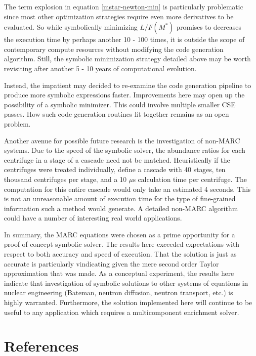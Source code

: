 \documentclass[preprint,12pt]{elsarticle}
\newcommand{\us}[0]{$\mu$s }
\begin{document}
The term explosion in equation \ref{mstar-newton-min} is particularly problematic 
since most other optimization strategies require
even more derivatives to be evaluated.  So while symbolically minimizing $L/F(M^*)$
 promises
to decreases the execution time by perhaps another 10 - 100 times, it is 
outside the scope of contemporary compute resources without modifying the 
code generation algorithm.  Still, the symbolic minimization strategy detailed above
may be worth revisiting after another 5 - 10 years of computational evolution.

Instead, the impatient may decided to re-examine the code generation pipeline to 
produce more symbolic expressions faster.  Improvements here may open up the 
possibility of
a symbolic minimizer.  This could involve multiple smaller CSE passes.  How 
such code generation routines fit together remains as an open problem.

Another avenue for possible future research is the investigation of non-MARC 
systems.  Due to the speed of the symbolic solver, the abundance ratios for 
each centrifuge in a stage of a cascade need not be matched.  Heuristically
if the centrifuges were treated individually, define a cascade with 40 stages, 
ten thousand centrifuges per stage, and a 10 \us calculation time per centrifuge. 
The computation for this entire
cascade would only take an estimated 4 seconds.  This is not an unreasonable 
amount of execution time for the type of fine-grained information such a 
method would generate.  A detailed non-MARC algorithm could have a number of
interesting real world applications.

In summary, the MARC equations were chosen as a prime opportunity for a 
proof-of-concept symbolic solver.  The results here exceeded expectations with 
respect to
both accuracy and speed of execution.  That the solution is just as accurate 
is particularly vindicating given the mere second order Taylor approximation that 
was made.  As a conceptual experiment, the results here indicate that
investigation of symbolic solutions to other systems of equations in 
nuclear engineering (Bateman, neutron diffusion, neutron transport, etc.) is
highly warranted.  Furthermore, the solution implemented here will continue to be 
useful to any application which requires a multicomponent enrichment solver.

\section*{References}
\label{sec:refs}
\end{document}
